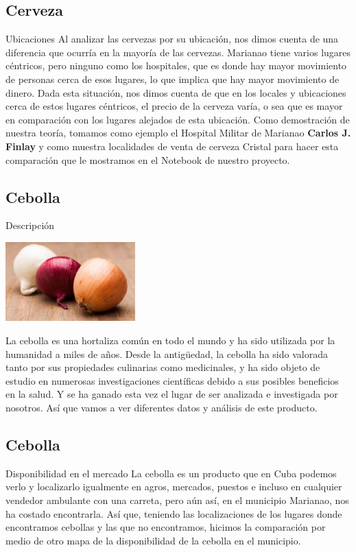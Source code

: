 \subsection{Cerveza}
\begin{frame}[fragile]{Ubicaciones}
  Al analizar las cervezas por su ubicación, nos dimos cuenta de una diferencia que ocurría en la mayoría de las cervezas. 
  Marianao tiene varios lugares céntricos, pero ninguno como los hospitales, que es donde hay mayor movimiento de personas cerca de esos lugares, lo que implica que hay mayor movimiento de dinero. 
  Dada esta situación, nos dimos cuenta de que en los locales y ubicaciones cerca de estos lugares céntricos, el precio de la cerveza varía, o sea que es mayor en comparación con los lugares alejados de esta ubicación. 
  Como demostración de nuestra teoría, tomamos como ejemplo el Hospital Militar de Marianao \textbf{Carlos J. Finlay} y como muestra localidades de venta de cerveza Cristal para hacer esta comparación que le mostramos en el Notebook de nuestro proyecto.
\end{frame}

\subsection{Cebolla}
\begin{frame}[fragile]{Descripción}
  \begin{flushright}
    \includegraphics[width=5cm]{cebolla.jpeg}
  \end{flushright}
  La cebolla es una hortaliza común en todo el mundo y ha sido utilizada por la humanidad a miles de años. Desde la antigüedad, 
  la cebolla ha sido valorada tanto por sus propiedades culinarias como medicinales, y ha sido objeto de estudio en numerosas investigaciones científicas debido a sus posibles beneficios en la salud. 
  Y se ha ganado esta vez el lugar de ser analizada e investigada por nosotros. 
  Así que vamos a ver diferentes datos y análisis de este producto.
\end{frame}

\subsection{Cebolla}
\begin{frame}[fragile]{Disponibilidad en el mercado}
  La cebolla es un producto que en Cuba podemos verlo y localizarlo igualmente en agros, mercados, puestos e incluso en cualquier vendedor ambulante con una carreta, pero aún así, en el municipio Marianao, nos ha costado encontrarla. 
  Así que, teniendo las localizaciones de los lugares donde encontramos cebollas y las que no encontramos, hicimos la comparación por medio de otro mapa de la disponibilidad de la cebolla en el municipio.
\end{frame}

